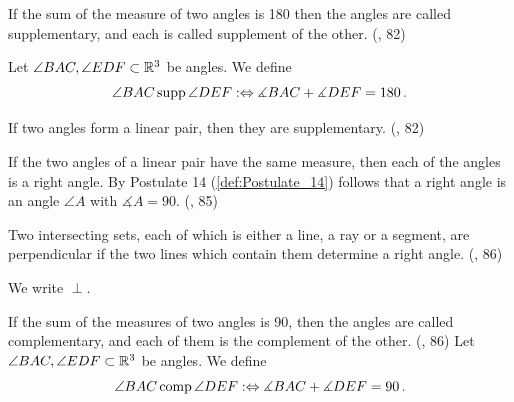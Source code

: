 \begin{definition}[Supplementary]\label{def:Supplementary}
  If the sum of the measure of two angles is 180 then the angles are called supplementary, and each is called supplement of the other.
  (\cite{SMSGGeometry}, 82)

  Let $\angle BAC, \angle EDF \subset \mathbb{R}^3$ be angles. We define
  \[
  {\angle BAC}\operatorname{supp}{\angle DEF}:\Leftrightarrow \measuredangle BAC + \measuredangle DEF=180\, \text{.}
  \]
\end{definition}


\begin{definition}\label{def:Postulate_14}
  If two angles form a linear pair, then they are supplementary.
  (\cite{SMSGGeometry}, 82)

\end{definition}

\begin{definition}\label{def:Right_Angle}
  If the two angles of a linear pair have the same measure, then each of the angles is a right angle.
  By Postulate 14 (\ref{def:Postulate_14}) follows that a right angle is an angle $\angle A$ with $\measuredangle A=90$.
  (\cite{SMSGGeometry}, 85)

\end{definition}

\begin{definition}[Perpendicular]\label{def:Perpendicular}
  Two intersecting sets, each of which is either a line, a ray or a segment, are perpendicular if the two lines which contain them determine a right angle.
  (\cite{SMSGGeometry}, 86)

  We write $\perp$.

\end{definition}

\begin{definition}[Complementary]\label{def:Complementary}
  If the sum of the measures of two angles is 90, then the angles are called complementary, and each of them is the complement of the other.
  (\cite{SMSGGeometry}, 86)
  Let $\angle BAC, \angle EDF \subset \mathbb{R}^3$ be angles. We define
  \[
  {\angle BAC}\operatorname{comp}{\angle DEF}:\Leftrightarrow \measuredangle BAC + \measuredangle DEF=90\, \text{.}
  \]

\end{definition}

